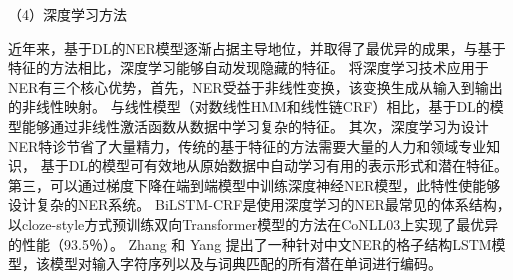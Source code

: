  （4）深度学习方法

 近年来，基于DL的NER模型逐渐占据主导地位，并取得了最优异的成果，与基于特征的方法相比，深度学习能够自动发现隐藏的特征。 
 将深度学习技术应用于NER有三个核心优势，首先，NER受益于非线性变换，该变换生成从输入到输出的非线性映射。
 与线性模型（对数线性HMM和线性链CRF）相比，基于DL的模型能够通过非线性激活函数从数据中学习复杂的特征。
 其次，深度学习为设计NER特诊节省了大量精力，传统的基于特征的方法需要大量的人力和领域专业知识，
 基于DL的模型可有效地从原始数据中自动学习有用的表示形式和潜在特征。
 第三，可以通过梯度下降在端到端模型中训练深度神经NER模型，此特性使能够设计复杂的NER系统。
 BiLSTM-CRF是使用深度学习的NER最常见的体系结构，
 以cloze-style方式预训练双向Transformer模型的方法在CoNLL03上实现了最优异的性能（93.5％）\cite{baevski2019cloze}。 
 Zhang 和 Yang 提出了一种针对中文NER的格子结构LSTM模型，该模型对输入字符序列以及与词典匹配的所有潜在单词进行编码\cite{zhang2018chinese}。





